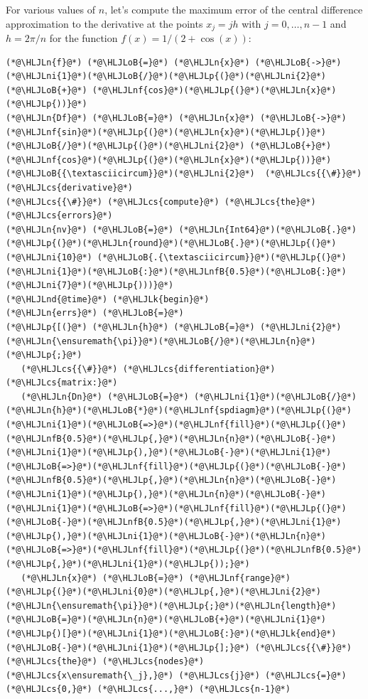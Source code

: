 \documentclass[12pt,a4paper]{article}
\newcommand{\HLJLk}[1]{\textcolor[RGB]{148,91,176}{\textbf{#1}}}
\newcommand{\HLJLn}[1]{#1}
\newcommand{\HLJLnd}[1]{\textcolor[RGB]{214,102,97}{#1}}
\newcommand{\HLJLnf}[1]{\textcolor[RGB]{66,102,213}{#1}}
\newcommand{\HLJLnfB}[1]{\textcolor[RGB]{59,151,46}{#1}}
\newcommand{\HLJLni}[1]{\textcolor[RGB]{59,151,46}{#1}}
\newcommand{\HLJLoB}[1]{\textcolor[RGB]{102,102,102}{\textbf{#1}}}
\newcommand{\HLJLp}[1]{#1}
\newcommand{\HLJLcs}[1]{\textcolor[RGB]{153,153,119}{\textit{#1}}}
\begin{document}
For various values of $n$, let's compute the maximum error of the central difference approximation to the derivative at the points $x_j = jh$ with $j = 0, \ldots, n-1$ and $h = 2\pi/n$ for the function $f(x) = 1/(2 + \cos(x))$:


\begin{lstlisting}
(*@\HLJLn{f}@*) (*@\HLJLoB{=}@*) (*@\HLJLn{x}@*) (*@\HLJLoB{->}@*) (*@\HLJLni{1}@*)(*@\HLJLoB{/}@*)(*@\HLJLp{(}@*)(*@\HLJLni{2}@*) (*@\HLJLoB{+}@*) (*@\HLJLnf{cos}@*)(*@\HLJLp{(}@*)(*@\HLJLn{x}@*)(*@\HLJLp{))}@*)
(*@\HLJLn{Df}@*) (*@\HLJLoB{=}@*) (*@\HLJLn{x}@*) (*@\HLJLoB{->}@*) (*@\HLJLnf{sin}@*)(*@\HLJLp{(}@*)(*@\HLJLn{x}@*)(*@\HLJLp{)}@*)(*@\HLJLoB{/}@*)(*@\HLJLp{(}@*)(*@\HLJLni{2}@*) (*@\HLJLoB{+}@*) (*@\HLJLnf{cos}@*)(*@\HLJLp{(}@*)(*@\HLJLn{x}@*)(*@\HLJLp{))}@*)(*@\HLJLoB{{\textasciicircum}}@*)(*@\HLJLni{2}@*)  (*@\HLJLcs{{\#}}@*) (*@\HLJLcs{derivative}@*)
(*@\HLJLcs{{\#}}@*) (*@\HLJLcs{compute}@*) (*@\HLJLcs{the}@*) (*@\HLJLcs{errors}@*)
(*@\HLJLn{nv}@*) (*@\HLJLoB{=}@*) (*@\HLJLn{Int64}@*)(*@\HLJLoB{.}@*)(*@\HLJLp{(}@*)(*@\HLJLn{round}@*)(*@\HLJLoB{.}@*)(*@\HLJLp{(}@*)(*@\HLJLni{10}@*) (*@\HLJLoB{.{\textasciicircum}}@*)(*@\HLJLp{(}@*)(*@\HLJLni{1}@*)(*@\HLJLoB{:}@*)(*@\HLJLnfB{0.5}@*)(*@\HLJLoB{:}@*)(*@\HLJLni{7}@*)(*@\HLJLp{)))}@*)
(*@\HLJLnd{@time}@*) (*@\HLJLk{begin}@*)
(*@\HLJLn{errs}@*) (*@\HLJLoB{=}@*) 
(*@\HLJLp{[(}@*) (*@\HLJLn{h}@*) (*@\HLJLoB{=}@*) (*@\HLJLni{2}@*)(*@\HLJLn{\ensuremath{\pi}}@*)(*@\HLJLoB{/}@*)(*@\HLJLn{n}@*)(*@\HLJLp{;}@*)
   (*@\HLJLcs{{\#}}@*) (*@\HLJLcs{differentiation}@*) (*@\HLJLcs{matrix:}@*)
   (*@\HLJLn{Dn}@*) (*@\HLJLoB{=}@*) (*@\HLJLni{1}@*)(*@\HLJLoB{/}@*)(*@\HLJLn{h}@*)(*@\HLJLoB{*}@*)(*@\HLJLnf{spdiagm}@*)(*@\HLJLp{(}@*)(*@\HLJLni{1}@*)(*@\HLJLoB{=>}@*)(*@\HLJLnf{fill}@*)(*@\HLJLp{(}@*)(*@\HLJLnfB{0.5}@*)(*@\HLJLp{,}@*)(*@\HLJLn{n}@*)(*@\HLJLoB{-}@*)(*@\HLJLni{1}@*)(*@\HLJLp{),}@*)(*@\HLJLoB{-}@*)(*@\HLJLni{1}@*)(*@\HLJLoB{=>}@*)(*@\HLJLnf{fill}@*)(*@\HLJLp{(}@*)(*@\HLJLoB{-}@*)(*@\HLJLnfB{0.5}@*)(*@\HLJLp{,}@*)(*@\HLJLn{n}@*)(*@\HLJLoB{-}@*)(*@\HLJLni{1}@*)(*@\HLJLp{),}@*)(*@\HLJLn{n}@*)(*@\HLJLoB{-}@*)(*@\HLJLni{1}@*)(*@\HLJLoB{=>}@*)(*@\HLJLnf{fill}@*)(*@\HLJLp{(}@*)(*@\HLJLoB{-}@*)(*@\HLJLnfB{0.5}@*)(*@\HLJLp{,}@*)(*@\HLJLni{1}@*)(*@\HLJLp{),}@*)(*@\HLJLni{1}@*)(*@\HLJLoB{-}@*)(*@\HLJLn{n}@*)(*@\HLJLoB{=>}@*)(*@\HLJLnf{fill}@*)(*@\HLJLp{(}@*)(*@\HLJLnfB{0.5}@*)(*@\HLJLp{,}@*)(*@\HLJLni{1}@*)(*@\HLJLp{));}@*)
   (*@\HLJLn{x}@*) (*@\HLJLoB{=}@*) (*@\HLJLnf{range}@*)(*@\HLJLp{(}@*)(*@\HLJLni{0}@*)(*@\HLJLp{,}@*)(*@\HLJLni{2}@*)(*@\HLJLn{\ensuremath{\pi}}@*)(*@\HLJLp{;}@*)(*@\HLJLn{length}@*)(*@\HLJLoB{=}@*)(*@\HLJLn{n}@*)(*@\HLJLoB{+}@*)(*@\HLJLni{1}@*)(*@\HLJLp{)[}@*)(*@\HLJLni{1}@*)(*@\HLJLoB{:}@*)(*@\HLJLk{end}@*)(*@\HLJLoB{-}@*)(*@\HLJLni{1}@*)(*@\HLJLp{];}@*) (*@\HLJLcs{{\#}}@*) (*@\HLJLcs{the}@*) (*@\HLJLcs{nodes}@*) (*@\HLJLcs{x\ensuremath{\_j},}@*) (*@\HLJLcs{j}@*) (*@\HLJLcs{=}@*) (*@\HLJLcs{0,}@*) (*@\HLJLcs{...,}@*) (*@\HLJLcs{n-1}@*)

\end{lstlisting}
\end{document}
